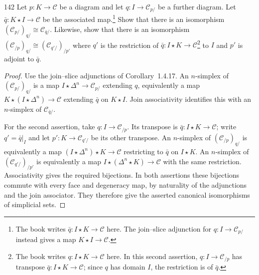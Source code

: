 \begin{exercise}{142}
Let $p\colon K\to\mathcal C$ be a diagram and let $q\colon I\to\mathcal C_{p/}$ be a further diagram. Let
$\bar q\colon K\star I\to\mathcal C$ be the associated map.\footnote{The book writes
$\bar q\colon I\star K\to\mathcal C$ here. The join--slice adjunction for
$q\colon I\to\mathcal C_{p/}$ instead gives a map $K\star I\to\mathcal C$.}
Show that there is an isomorphism $(\mathcal C_{p/})_{q/}\cong\mathcal C_{\bar q/}$.
Likewise, show that there is an isomorphism $(\mathcal C_{/p})_{q/}\cong(\mathcal C_{q'/})_{/p'}$ where $q'$ is the restriction
of $\bar q\colon I\star K\to\mathcal C$\footnote{The book writes
$q\colon I\star K\to\mathcal C$ here. In this second assertion,
$q\colon I\to\mathcal C_{/p}$ has transpose $\bar q\colon I\star K\to\mathcal C$;
since $q$ has domain $I$, the restriction is of $\bar q$.}
to $I$ and $p'$ is adjoint to $\bar q$.

\begin{proof}
Use the join--slice adjunctions of Corollary~1.4.17.
An $n$-simplex of $(\mathcal C_{p/})_{q/}$ is a map
$I\star\Delta^n\to\mathcal C_{p/}$ extending $q$, equivalently a map
$K\star(I\star\Delta^n)\to\mathcal C$ extending $\bar q$ on $K\star I$.
Join associativity identifies this with an $n$-simplex of
$\mathcal C_{\bar q/}$.

For the second assertion, take $q\colon I\to\mathcal C_{/p}$.
Its transpose is $\bar q\colon I\star K\to\mathcal C$;
write $q'=\bar q|_I$ and let $p'\colon K\to\mathcal C_{q'/}$
be its other transpose.
An $n$-simplex of $(\mathcal C_{/p})_{q/}$ is equivalently a map
$(I\star\Delta^n)\star K\to\mathcal C$ restricting to $\bar q$ on $I\star K$.
An $n$-simplex of $(\mathcal C_{q'/})_{/p'}$ is equivalently a map
$I\star(\Delta^n\star K)\to\mathcal C$ with the same restriction.
Associativity gives the required bijections.
In both assertions these bijections commute with every face and
degeneracy map, by naturality of the adjunctions and the join associator.
They therefore give the asserted canonical isomorphisms of simplicial sets.
\end{proof}
\end{exercise}
